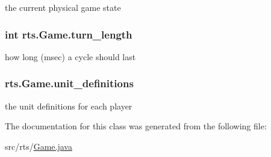 \label{classrts_1_1_game_ae331647ec1f54d6a50a02565fb3d6c20}
the current physical game state \hypertarget{classrts_1_1_game_a2a5214aaead1520fcec785be9eb47e80}{
\subsubsection[{turn\_\-length}]{\setlength{\rightskip}{0pt plus 5cm}int {\bf rts.Game.turn\_\-length}}}
\label{classrts_1_1_game_a2a5214aaead1520fcec785be9eb47e80}
how long (msec) a cycle should last \hypertarget{classrts_1_1_game_ab0b00f1b077c24f37b2dff624f77d33c}{
\subsubsection[{unit\_\-definitions}]{ {\bf rts.Game.unit\_\-definitions}}}
\label{classrts_1_1_game_ab0b00f1b077c24f37b2dff624f77d33c}
the unit definitions for each player 

The documentation for this class was generated from the following file:\begin{DoxyCompactItemize}
\item 
src/rts/\hyperlink{_game_8java}{Game.java}\end{DoxyCompactItemize}
